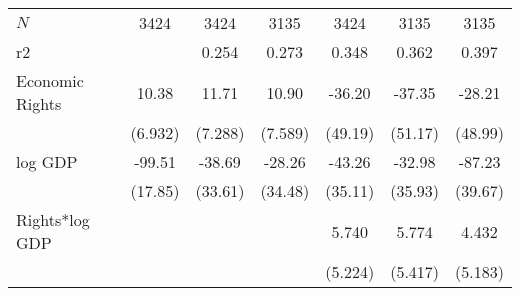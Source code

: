 \documentclass[10pt,letterpaper,subeqn]{beamer}
\begin{document}
\begin{frame}
\begin{table}[htbp]
\begin{tabular}{l*{6}{c}}
\hline
\(N\)       &        3424         &        3424         &        3135         &        3424         &        3135         &        3135         \\
r2          &                     &       0.254         &       0.273         &       0.348         &       0.362         &       0.397         \\
\hline\hline
Economic Rights      &       10.38         &       11.71         &       10.90         &      -36.20         &      -37.35         &      -28.21         \\
            &     (6.932)         &     (7.288)         &     (7.589)         &     (49.19)         &     (51.17)         &     (48.99)         \\

log GDP         &      -99.51\sym{***}&      -38.69         &      -28.26         &      -43.26         &      -32.98         &      -87.23\sym{**} \\
            &     (17.85)         &     (33.61)         &     (34.48)         &     (35.11)         &     (35.93)         &     (39.67)         \\


Rights*log GDP  &                     &                     &                     &       5.740         &       5.774         &       4.432         \\
            &                     &                     &                     &     (5.224)         &     (5.417)         &     (5.183)         \\



\end{tabular}
\end{table}
\end{frame}
\end{document}
